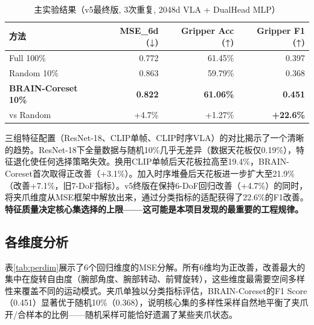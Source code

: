 \documentclass[11pt,a4paper,fontset=none]{ctexart}
\begin{document}
\begin{table}[H]
\centering\small
\caption{主实验结果（v5最终版, 3次重复, 2048d VLA + DualHead MLP）}
\label{tab:main}
\begin{tabular}{@{}lrrr@{}}
\toprule
\textbf{方法} & \textbf{MSE\_6d (↓)} & \textbf{Gripper Acc (↑)} & \textbf{Gripper F1 (↑)} \\
\midrule
Full 100\% & 0.772 & 61.45\% & 0.397 \\
Random 10\% & 0.863 & 59.79\% & 0.368 \\
\textbf{BRAIN-Coreset 10\%} & \textbf{0.822} & \textbf{61.06\%} & \textbf{0.451} \\
\midrule
vs Random & +4.7\% & +1.27\% & \textbf{+22.6\%} \\
\bottomrule
\end{tabular}
\end{table}

三组特征配置（ResNet-18、CLIP单帧、CLIP时序VLA）的对比揭示了一个清晰的趋势。ResNet-18下全量数据与随机10\%几乎无差异（数据天花板仅0.19\%），特征退化使任何选择策略失效。换用CLIP单帧后天花板拉高至19.4\%，BRAIN-Coreset首次取得正改善（+3.1\%）。加入时序堆叠后天花板进一步扩大至21.9\%（改善+7.1\%，旧7-DoF指标）。v5终版在保持6-DoF回归改善（+4.7\%）的同时，将夹爪维度从MSE框架中解放出来，通过分类指标的适配获得了22.6\%的F1改善。\textbf{特征质量决定核心集选择的上限——这可能是本项目发现的最重要的工程规律。}

\subsection{各维度分析}

表\ref{tab:perdim}展示了6个回归维度的MSE分解。所有6维均为正改善，改善最大的集中在旋转自由度（腕部角度、腕部转动、前臂旋转），这些维度最需要空间多样性来覆盖不同的运动模式。夹爪单独以分类指标评估，BRAIN-Coreset的F1 Score（0.451）显著优于随机10\%（0.368），说明核心集的多样性采样自然地平衡了夹爪开/合样本的比例——随机采样可能恰好遗漏了某些夹爪状态。
\end{document}

